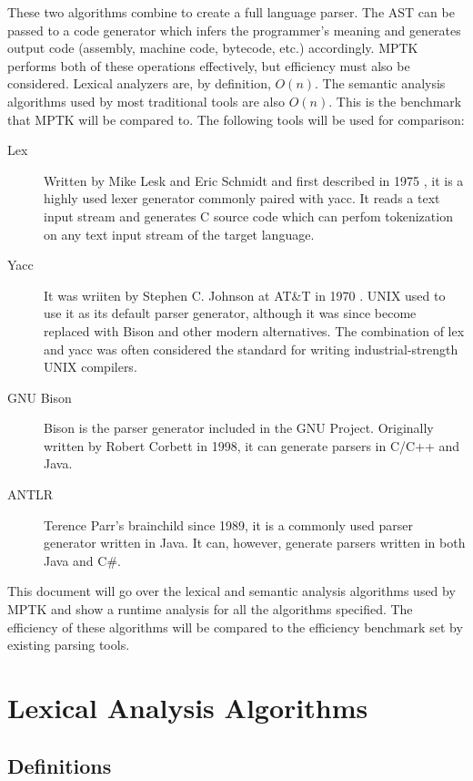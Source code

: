 \documentclass[10pt,a4paper]{article}
\begin{document}
These two algorithms combine to create a full language parser. The AST can be passed to a code generator which infers the programmer's meaning and generates output code (assembly, machine code, bytecode, etc.) accordingly. MPTK performs both of these operations effectively, but efficiency must also be considered. Lexical analyzers are, by definition, $O(n)$. The semantic analysis algorithms used by most traditional tools are also $O(n)$. This is the benchmark that MPTK will be compared to. The following tools will be used for comparison:\newline
\begin{description}
\item[Lex] Written by Mike Lesk and Eric Schmidt and first described in 1975 \cite{LEX_Book}, it is a highly used lexer generator commonly paired with yacc. It reads a text input stream and generates C source code which can perfom tokenization on any text input stream of the target language.
\item[Yacc] It was wriiten by Stephen C. Johnson at AT\&T in 1970 \cite{YACC_Book}. UNIX used to use it as its default parser generator, although it was since become replaced with Bison and other modern alternatives. The combination of lex and yacc was often considered the standard for writing industrial-strength UNIX compilers.
\item[GNU Bison] Bison is the parser generator included in the GNU Project. Originally written by Robert Corbett in 1998, it can generate parsers in C/C++ and Java.
\item[ANTLR] Terence Parr's brainchild since 1989, it is a commonly used parser generator written in Java. It can, however, generate parsers written in both Java and C\#. 
\end{description}

This document will go over the lexical and semantic analysis algorithms used by MPTK and show a runtime analysis for all the algorithms specified. The efficiency of these algorithms will be compared to the efficiency benchmark set by existing parsing tools.

\section{Lexical Analysis Algorithms}

\subsection{Definitions}
\end{document}
